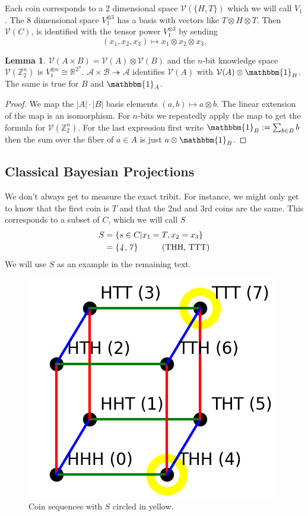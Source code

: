 \documentclass[12pt,a4paper]{article}
\theoremstyle{myrule}
\theoremstyle{postulate}
\theoremstyle{definition}
\newtheorem{lemma}[theorem]{Lemma}
\begin{document}
Each coin corresponds to a 2 dimensional space $\mathcal{V}(\{H,T\})$ which we will call $V_1$.  The 8 dimensional space $V_1 ^ {\otimes 3}$ has a basis with vectors like $T \otimes H \otimes T$.  Then $\mathcal{V}(C)$, is identified with the tensor power $V_1^{\otimes 3}$ by sending
\[
(x_1,x_2,x_3) \mapsto x_1 \otimes x_2 \otimes x_3.
\]

\begin{lemma}
\label{product}
  $\mathcal{V}(A \times B) = \mathcal{V}(A) \otimes \mathcal{V}(B)$ and the $n$-bit knowledge space $\mathcal{V}(\mathbb{Z}_2^n)$ is $V_1 ^ {\otimes n} \cong \mathbb{R}^{2^n}$.  $\mathcal{A \times B \twoheadrightarrow A}$ identifies $\mathcal{V}(A)$ with $\mathcal{V}(A) \otimes \mathbbm{1}_B$.  The same is true for $B$ and $\mathbbm{1}_A$.
\end{lemma}
\begin{proof}
  We map the $|A|\cdot|B|$ basis elements $(a,b) \mapsto a \otimes b$.  The linear extension of the map is an isomorphism.  For $n$-bits we repeatedly apply the map to get the formula for $\mathcal{V}(\mathbb{Z}_2^n)$.  For the last expression first write $\mathbbm{1}_B := \sum_{b \in B} b$ then the sum over the fiber of $a \in A$ is just $a \otimes \mathbbm{1}_B$.
\end{proof}


\subsection{Classical Bayesian Projections}
\label{proj}
We don't always get to measure the exact tribit.  For instance, we might only get to know that the first coin is $T$ and that the 2nd and 3rd coins are the same.  This corresponds to a subset of $C$, which we will call $S$
\[
\begin{split}
  S &= \{s \in C | x_1 = T, x_2 = x_3 \} \\
    & = \{\mathit{4},\mathit{7}\} \hspace{0.4 in} \text{(THH, TTT)}
\end{split}
\]
We will use $S$ as an example in the remaining text.

\begin{figure}[h]
\centering
\includegraphics[scale=0.6]{cube.png}
\caption{Coin sequences with $S$ circled in yellow.}
\label{masslessshell}
\end{figure}
\end{document}
